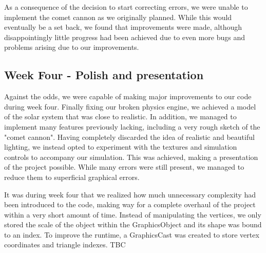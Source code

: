 As a consequence of the decision to start correcting errors, we were unable to implement the comet cannon as we originally planned. While this would eventually be a set back, we found that improvements were made, although disappointingly little progress had been achieved due to even more bugs and problems arising due to our improvements.

\subsection{Week Four - Polish and presentation}
Against the odds, we were capable of making major improvements to our code during week four. Finally fixing our broken physics engine, we achieved a model of the solar system that was close to realistic. In addition, we managed to implement many features previously lacking, including a very rough sketch of the "comet cannon". Having completely discarded the idea of realistic and beautiful lighting, we instead opted to experiment with the textures and simulation controls to accompany our simulation. This was achieved, making a presentation of the project possible. While many errors were still present, we managed to reduce them to superficial graphical errors.

It was during week four that we realized how much unnecessary complexity had been introduced to the code, making way for a complete overhaul of the project within a very short amount of time. Instead of manipulating the vertices, we only stored the scale of the object within the GraphicsObject and its shape was bound to an index. To improve the runtime, a GraphicsCast was created to store vertex coordinates and triangle indexes. TBC

\textsl{}